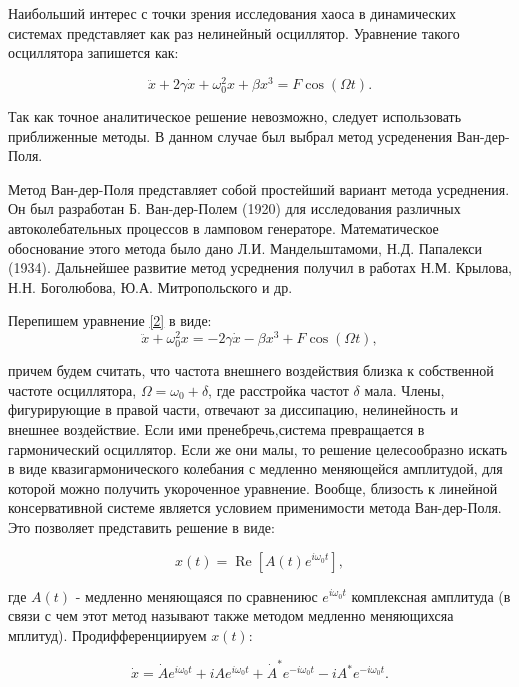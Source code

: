 \documentclass[11pt]{article}
\begin{document}
Наибольший интерес с точки зрения исследования хаоса в динамических
системах представляет как раз нелинейный осциллятор. Уравнение такого
осциллятора запишется как:

\begin{equation}
    \label{2}
    \ddot{x} + 2 \gamma \dot{x} + \omega_{0}^{2} x + \beta x^3 = F \cos(\Omega t).
\end{equation}

Так как точное аналитическое решение невозможно, следует использовать
приближенные методы. В данном случае был выбрал метод усреденения
Ван-дер-Поля.

Метод Ван-дер-Поля представляет собой простейший вариант метода
усреднения. Он был разработан Б. Ван-дер-Полем (1920) для исследования
различных автоколебательных процессов в ламповом генераторе.
Математическое обоснование этого метода было дано Л.И. Мандельштамоми,
Н.Д. Папалекси (1934). Дальнейшее развитие метод усреднения получил в
работах Н.М. Крылова, Н.Н. Боголюбова, Ю.А. Митропольского и др.

Перепишем уравнение \eqref{2} в виде: \begin{equation}
    \label{3}
    \ddot{x} + \omega_0^{2} x = -2 \gamma \dot{x} - \beta x^3 + F \cos(\Omega t), 
\end{equation}

причем будем считать, что частота внешнего воздействия близка к
собственной частоте осциллятора, \(\Omega = \omega_0 + \delta\), где
расстройка частот \(\delta\) мала. Члены, фигурирующие в правой части,
отвечают за диссипацию, нелинейность и внешнее воздействие. Если ими
пренебречь,система превращается в гармонический осциллятор. Если же они
малы, то решение целесообразно искать в виде квазигармонического
колебания с медленно меняющейся амплитудой, для которой можно получить
укороченное уравнение. Вообще, близость к линейной консервативной
системе является условием применимости метода Ван-дер-Поля. Это
позволяет представить решение в виде:

\begin{equation}
x(t)=\operatorname{Re}\left[A(t) e^{i \omega_{0} t}\right],
\end{equation}

где \(A(t)\) - медленно меняющаяся по сравнениюс \(e^{i \omega_0 t}\)
комплексная амплитуда (в связи с чем этот метод называют также методом
медленно меняющихсяа мплитуд). Продифференциируем \(x(t)\):

\begin{equation}
\dot{x}=\dot{A} e^{i \omega_0 t}+i A e^{i \omega_0 t}+\dot{A}^{*} e^{-i \omega_0 t}-i A^{*} e^{-i \omega_0 t}.
\end{equation}
\end{document}
